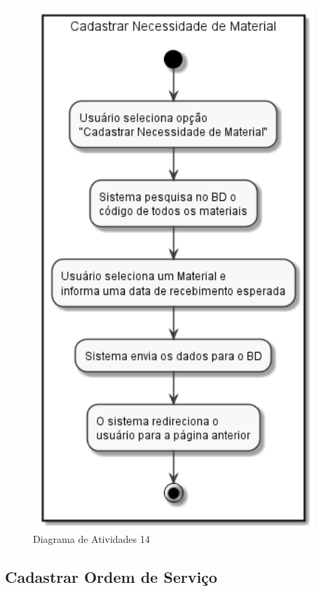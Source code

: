 \documentclass[rascunho,xindy,acronym,symbols]{fei}
\begin{document}
\begin{figure}[H]
    \centering
    \includegraphics[scale=0.6, width=300pt]{./Images/Cadastrar_Necessidade_de_Material.png}
    \caption{Diagrama de Atividades 14}
    \label{fig:diag_atv14}
\end{figure}

\subsection{Cadastrar Ordem de Serviço}
\end{document}
